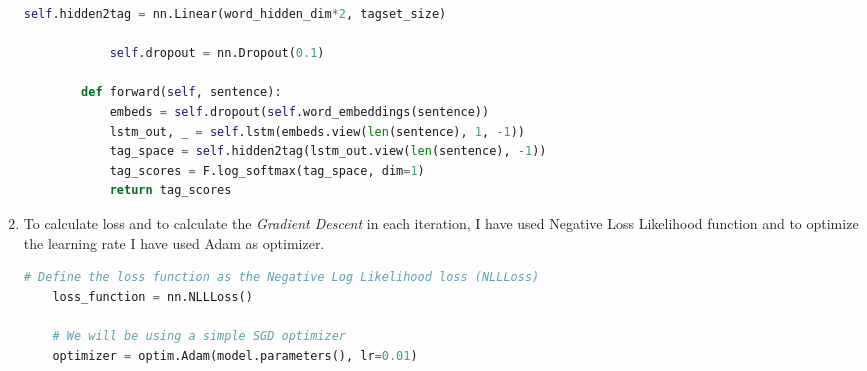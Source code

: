 \begin{enumerate}
\begin{lstlisting}[language=Python]
        	self.hidden2tag = nn.Linear(word_hidden_dim*2, tagset_size)

        	self.dropout = nn.Dropout(0.1)

    	def forward(self, sentence):
        	embeds = self.dropout(self.word_embeddings(sentence))
        	lstm_out, _ = self.lstm(embeds.view(len(sentence), 1, -1))
        	tag_space = self.hidden2tag(lstm_out.view(len(sentence), -1))
        	tag_scores = F.log_softmax(tag_space, dim=1)
        	return tag_scores

	\end{lstlisting}
	
	\item To calculate loss and to calculate the \textit{Gradient Descent} in each iteration, I have used Negative Loss Likelihood function and to optimize the learning rate I have used Adam as optimizer.
	\begin{lstlisting}[language=Python]
	# Define the loss function as the Negative Log Likelihood loss (NLLLoss)
	loss_function = nn.NLLLoss()

	# We will be using a simple SGD optimizer
	optimizer = optim.Adam(model.parameters(), lr=0.01)
	\end{lstlisting}
\end{enumerate}